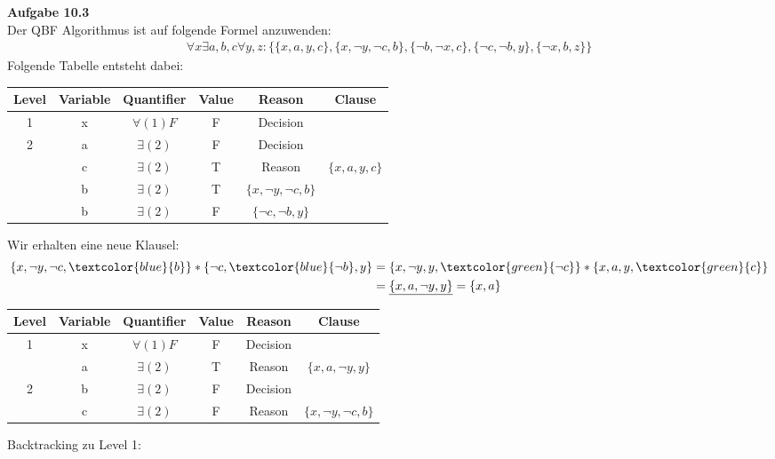 \newpage
\noindent\textbf{Aufgabe 10.3}\\
Der QBF Algorithmus ist auf folgende Formel anzuwenden:
\begin{align*}
\forall x \exists a,b,c \forall y,z:
\{ 
\{x,a,y,c\},
\{x,\neg y, \neg c,b\},
\{\neg b, \neg x, c\},
\{\neg c,\neg b, y\},
\{\neg x,b,z\} \}
\end{align*}
Folgende Tabelle entsteht dabei:
\begin{center}
	\begin{tabular}{|c|c|c|c|c|c|}
		\hline 
		Level & Variable & Quantifier & Value & Reason & Clause \\ 
		\hline 
		1 & x & $\forall(1)F$ & F & Decision &  \\ 
		\hline 
		2 & a & $\exists(2)$ & F & Decision &  \\ 
		\hline 
		& c & $\exists(2)$ & T & Reason & $\{x,a,y,c\}$ \\ 
		\hline 
		& b & $\exists(2)$ & T & $\{x,\neg y, \neg c,b \}$ &  \\ 
		\hline 
		& b & $\exists(2)$ & F & $\{\neg c,\neg b, y\}$ &  \\ 
		\hline 
	\end{tabular}
\end{center}
Wir erhalten eine neue Klausel:
\begin{align*}
\{x,\neg y,\neg c,\textcolor{blue}{b} \} \ast \{\neg c, \textcolor{blue}{\neg b}, y \} &= \{x,\neg y, y, \textcolor{green}{\neg c} \} \ast \{x,a,y,\textcolor{green}{c} \}\\
&= \underline{\{x,a,\neg y, y\}} = \{x,a\}
\end{align*}
\begin{center}
	\begin{tabular}{|c|c|c|c|c|c|}
		\hline 
		Level & Variable & Quantifier & Value & Reason & Clause \\ 
		\hline 
		1 & x & $\forall(1)F$ & F & Decision &  \\ 
		\hline 
		& a & $\exists(2)$ & T & Reason & $\{x,a,\neg y,y\}$ \\ 
		\hline 
		2 & b & $\exists(2)$ & F & Decision &  \\ 
		\hline 
		& c & $\exists(2)$ & F & Reason & $\{x,\neg y,\neg c,b\}$ \\ 
		\hline 
	\end{tabular} 
\end{center}
Backtracking zu Level 1:
